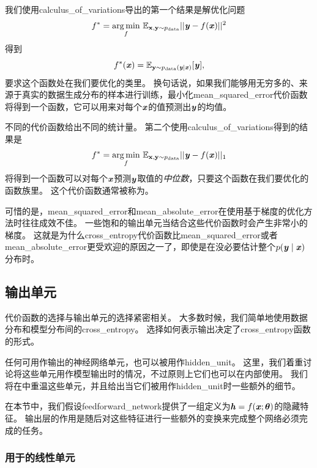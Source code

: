 
我们使用\gls{calculus_of_variations}导出的第一个结果是解优化问题
\begin{equation}
f^* = \underset{f}{\arg\min}  \ \mathbb{E}_{\mathbf{x}, \mathbf{y} \sim  p_\text{data}} ||\boldsymbol{\mathit{y}}-f(\boldsymbol{\mathit{x}})||^2
\end{equation}
得到
\begin{equation}
f^*(\boldsymbol{\mathit{x}}) = \mathbb{E}_{\mathbf{y}\sim p_\text{data}(\boldsymbol{\mathit{y}}|\boldsymbol{\mathit{x}})} [\boldsymbol{\mathit{y}}],
\end{equation}
要求这个函数处在我们要优化的类里。
换句话说，如果我们能够用无穷多的、来源于真实的数据生成分布的样本进行训练，最小化\gls{mean_squared_error}代价函数将得到一个函数，它可以用来对每个$\boldsymbol{\mathit{x}}$的值预测出$\boldsymbol{\mathit{y}}$的均值。

不同的代价函数给出不同的统计量。
第二个使用\gls{calculus_of_variations}得到的结果是
\begin{equation}
f^* = \underset{f}{\arg\min} \ \mathbb{E}_{\mathbf{x}, \mathbf{y} \sim  p_\text{data}} ||\boldsymbol{\mathit{y}} - f(\boldsymbol{\mathit{x}})||_1
\end{equation}
将得到一个函数可以对每个$\boldsymbol{\mathit{x}}$预测$\boldsymbol{\mathit{y}}$取值的\emph{中位数}，只要这个函数在我们要优化的函数族里。
这个代价函数通常被称为。

可惜的是，\gls{mean_squared_error}和\gls{mean_absolute_error}在使用基于梯度的优化方法时往往成效不佳。
一些饱和的输出单元当结合这些代价函数时会产生非常小的梯度。
这就是为什么\gls{cross_entropy}代价函数比\gls{mean_squared_error}或者\gls{mean_absolute_error}更受欢迎的原因之一了，即使是在没必要估计整个$p(\boldsymbol{\mathit{y}}\mid\boldsymbol{\mathit{x}})$分布时。


\subsection{输出单元}
\label{sec:output_units}

代价函数的选择与输出单元的选择紧密相关。
大多数时候，我们简单地使用数据分布和模型分布间的\gls{cross_entropy}。
选择如何表示输出决定了\gls{cross_entropy}函数的形式。

任何可用作输出的神经网络单元，也可以被用作\gls{hidden_unit}。
这里，我们着重讨论将这些单元用作模型输出时的情况，不过原则上它们也可以在内部使用。
我们将在中重温这些单元，并且给出当它们被用作\gls{hidden_unit}时一些额外的细节。

在本节中，我们假设\gls{feedforward_network}提供了一组定义为$\boldsymbol{\mathit{h}}=f(\boldsymbol{\mathit{x}};\boldsymbol{\theta})$的隐藏特征。
输出层的作用是随后对这些特征进行一些额外的变换来完成整个网络必须完成的任务。


\subsubsection{用于的线性单元}
\label{sec:linear_units_for_gaussian_output_distributions}

